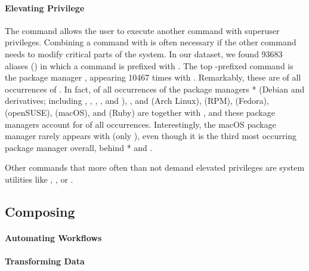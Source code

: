 \paragraph{\bf Elevating Privilege}

The  command allows the user to execute another command with superuser privileges.
Combining a command with  is often necessary if the other command needs to modify critical parts of the system.
In our dataset, we found \num{93683} aliases () in which a command is prefixed with .
The top -prefixed command is the package manager , appearing \num{10467} times with .
Remarkably, these are  of all occurrences of .
In fact,  of all occurrences of the package managers * (Debian and derivatives; including , , , , and ), ,  and  (Arch Linux),  (RPM),  (Fedora),  (openSUSE),  (macOS), and  (Ruby) are together with , and these package managers account for  of all  occurrences.
Interestingly, the macOS package manager  rarely appears with  (only ), even though it is the third most occurring package manager overall, behind * and .

Other commands that more often than not demand elevated privileges are system utilities like , ,  or .

\subsection{Composing}

\paragraph{\bf Automating Workflows}

\TODO

\paragraph{\bf Transforming Data}

